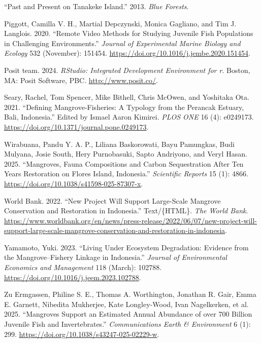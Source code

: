 \documentclass[
]{article}
\newlength{\cslhangindent}
\newenvironment{CSLReferences}[2] %
 {\begin{list}{}{%
  \setlength{\itemindent}{0pt}
  \setlength{\leftmargin}{0pt}
  \setlength{\parsep}{0pt}
  \ifodd #1
   \setlength{\leftmargin}{\cslhangindent}
   \setlength{\itemindent}{-1\cslhangindent}
  \fi
  \setlength{\itemsep}{#2\baselineskip}}}
 {\end{list}}
\begin{document}
\begin{CSLReferences}{1}{0}
{``Past and {Present} on {Tanakeke Island}.''} 2013. \emph{Blue Forests}.

Piggott, Camilla V. H., Martial Depczynski, Monica Gagliano, and Tim J. Langlois. 2020. {``Remote Video Methods for Studying Juvenile Fish Populations in Challenging Environments.''} \emph{Journal of Experimental Marine Biology and Ecology} 532 (November): 151454. \url{https://doi.org/10.1016/j.jembe.2020.151454}.

Posit team. 2024. \emph{RStudio: Integrated Development Environment for r}. Boston, MA: Posit Software, PBC. \url{http://www.posit.co/}.

Seary, Rachel, Tom Spencer, Mike Bithell, Chris McOwen, and Yoshitaka Ota. 2021. {``Defining Mangrove-Fisheries: {A} Typology from the {Perancak Estuary}, {Bali}, {Indonesia}.''} Edited by Ismael Aaron Kimirei. \emph{PLOS ONE} 16 (4): e0249173. \url{https://doi.org/10.1371/journal.pone.0249173}.

Wirabuana, Pandu Y. A. P., Liliana Baskorowati, Bayu Pamungkas, Budi Mulyana, Josie South, Hery Purnobasuki, Sapto Andriyono, and Veryl Hasan. 2025. {``Mangroves, Fauna Compositions and Carbon Sequestration After Ten Years Restoration on {Flores Island}, {Indonesia}.''} \emph{Scientific Reports} 15 (1): 4866. \url{https://doi.org/10.1038/s41598-025-87307-x}.

World Bank. 2022. {``New {Project} Will {Support} {Large}-{Scale} {Mangrove} {Conservation} and {Restoration} in {Indonesia}.''} Text/\{HTML\}. \emph{The World Bank}. \url{https://www.worldbank.org/en/news/press-release/2022/06/07/new-project-will-support-large-scale-mangrove-conservation-and-restoration-in-indonesia}.

Yamamoto, Yuki. 2023. {``Living Under Ecosystem Degradation: {Evidence} from the Mangrove--Fishery Linkage in {Indonesia}.''} \emph{Journal of Environmental Economics and Management} 118 (March): 102788. \url{https://doi.org/10.1016/j.jeem.2023.102788}.

Zu Ermgassen, Philine S. E., Thomas A. Worthington, Jonathan R. Gair, Emma E. Garnett, Nibedita Mukherjee, Kate Longley-Wood, Ivan Nagelkerken, et al. 2025. {``Mangroves Support an Estimated Annual Abundance of over 700 Billion Juvenile Fish and Invertebrates.''} \emph{Communications Earth \& Environment} 6 (1): 299. \url{https://doi.org/10.1038/s43247-025-02229-w}.

\end{CSLReferences}
\end{document}
